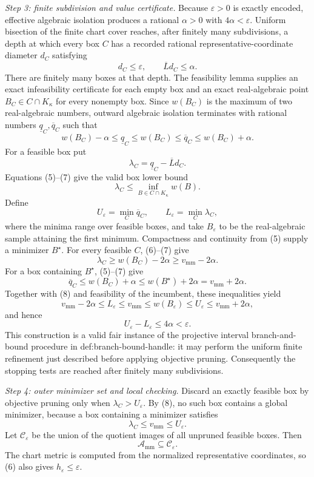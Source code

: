 \emph{Step 3: finite subdivision and value certificate.}
Because \(\varepsilon>0\) is exactly encoded, effective algebraic isolation produces a rational \(\alpha>0\) with \(4\alpha<\varepsilon\).  Uniform bisection of the finite chart cover reaches, after finitely many subdivisions, a depth at which every box \(C\) has a recorded rational representative-coordinate diameter \(d_C\) satisfying
\[
d_C\le\varepsilon,
\qquad
\overline Ld_C\le\alpha. \tag{6}
\]
There are finitely many boxes at that depth.  The feasibility lemma supplies an exact infeasibility certificate for each empty box and an exact real-algebraic point \(B_C\in C\cap K_\kappa\) for every nonempty box.  Since \(w(B_C)\) is the maximum of two real-algebraic numbers, outward algebraic isolation terminates with rational numbers \(\underline q_C,\overline q_C\) such that
\[
w(B_C)-\alpha\le\underline q_C\le w(B_C)
\le\overline q_C\le w(B_C)+\alpha. \tag{7}
\]
For a feasible box put
\[
\lambda_C=\underline q_C-\overline Ld_C.
\]
Equations (5)--(7) give the valid box lower bound
\[
\lambda_C\le
\inf_{B\in C\cap K_\kappa}w(B). \tag{8}
\]
Define
\[
U_\varepsilon=\min_C\overline q_C,
\qquad
L_\varepsilon=\min_C\lambda_C,
\]
where the minima range over feasible boxes, and take \(B_\varepsilon\) to be the real-algebraic sample attaining the first minimum.  Compactness and continuity from (5) supply a minimizer \(B^\star\).  For every feasible \(C\), (6)--(7) give
\[
\lambda_C\ge w(B_C)-2\alpha\ge v_{\mathrm{mm}}-2\alpha.
\]
For a box containing \(B^\star\), (5)--(7) give
\[
\overline q_C\le w(B_C)+\alpha
\le w(B^\star)+2\alpha
=v_{\mathrm{mm}}+2\alpha.
\]
Together with (8) and feasibility of the incumbent, these inequalities yield
\[
v_{\mathrm{mm}}-2\alpha
\le L_\varepsilon\le v_{\mathrm{mm}}
\le w(B_\varepsilon)\le U_\varepsilon
\le v_{\mathrm{mm}}+2\alpha,
\]
and hence
\[
U_\varepsilon-L_\varepsilon\le4\alpha<\varepsilon. \tag{9}
\]
This construction is a valid fair instance of the projective interval branch-and-bound procedure in def:branch-bound-handle: it may perform the uniform finite refinement just described before applying objective pruning.  Consequently the stopping tests are reached after finitely many subdivisions.

\emph{Step 4: outer minimizer set and local checking.}
Discard an exactly feasible box by objective pruning only when \(\lambda_C>U_\varepsilon\).  By (8), no such box contains a global minimizer, because a box containing a minimizer satisfies
\[
\lambda_C\le v_{\mathrm{mm}}\le U_\varepsilon.
\]
Let \(\mathcal C_\varepsilon\) be the union of the quotient images of all unpruned feasible boxes.  Then
\[
\mathcal A_{\mathrm{mm}}\subseteq\mathcal C_\varepsilon.
\]
The chart metric is computed from the normalized representative coordinates, so (6) also gives \(h_\varepsilon\le\varepsilon\).

